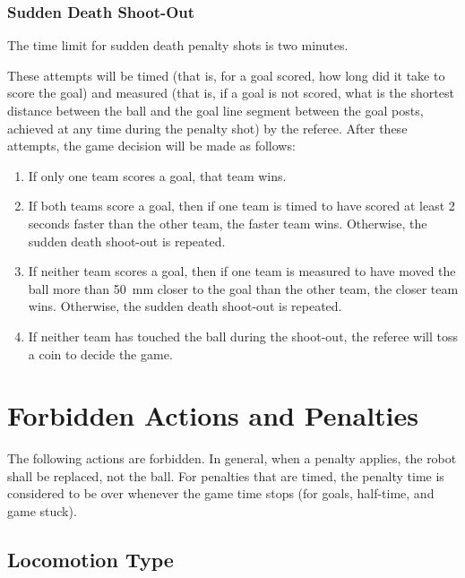 \documentclass[12pt]{article}
\begin{document}
\subsubsection{Sudden Death Shoot-Out}

The time limit for sudden death penalty shots is two minutes.

These attempts will be timed (that is, for a goal scored, how long did it take to score the goal) and measured (that is, if a goal is not scored, what is the shortest distance between the ball and the goal line segment between the goal posts, achieved at any time during the penalty shot) by the referee. After these attempts, the game decision will be made as follows:

\begin{enumerate}

\item If only one team scores a goal, that team wins.

\item If both teams score a goal, then if one team is timed to have scored at least 2 seconds faster than the other team, the faster team wins. Otherwise, the sudden death shoot-out is repeated.

\item If neither team scores a goal, then if one team is measured to have moved the ball more than 50~mm closer to the goal than the other team, the closer team wins. Otherwise, the sudden death shoot-out is repeated.

\item If neither team has touched the ball during the shoot-out, the referee will toss a coin to decide the game.

\end{enumerate}


\newpage


\section{Forbidden Actions and Penalties}
\label{sec:forbidden_act}

The following actions are forbidden. In general, when a penalty applies, the robot shall be replaced, not the ball. For penalties that are timed, the penalty time is considered to be over whenever the game time stops (for goals, half-time, and game stuck).

\subsection{Locomotion Type}
\label{sec:locomotion_type}
\end{document}
